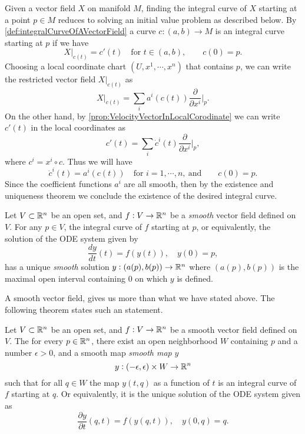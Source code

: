 Given a vector field $ X $ on manifold $ M $, finding the integral curve of $ X $ starting at a point $ p \in M $ reduces to solving an initial value problem as described below. By \autoref{def:integralCurveOfAVectorField} a curve $ c:(a,b) \to M $ is an integral curve starting at $ p $ if we have
\[ X|_{c(t)} = c'(t) \quad \text{for } t\in (a,b),\qquad c(0) = p.   \]
Choosing a local coordinate chart $ (U,x^1,\cdots,x^n) $ that contains $ p $, we can write the restricted vector field $ X|_{c(t)} $ as
\[ X|_{c(t)} = \sum_i a^i(c(t)) \frac{\partial}{\partial x^i}\big|_{p}.  \]
On the other hand, by \autoref{prop:VelocityVectorInLocalCorodinate} we can write $ c'(t) $ in the local coordinates as
\[ c'(t) = \sum_i \dot{c}^i(t) \frac{\partial }{\partial x^i}\big|_{p},    \]
where $ c^i = x^i \circ c $.
Thus we will have
\[ \dot{c}^i(t) = a^i(c(t)) \quad \text{for } i=1,\cdots,n,\ \text{and} \qquad c(0) = p.\]
Since the coefficient functions $ a^i $ are all smooth, then by the existence and uniqueness theorem we conclude the existence of the desired integral curve. 

\begin{theorem}
	Let $ V \subset \mathbb{R}^n $ be an open set, and $ f: V\to \mathbb{R}^n $ be a \emph{smooth} vector field defined on $ V $. For any $ p \in V $,  the integral curve of $ f $ starting at $ p $, or equivalently, the solution of the ODE system given by
	\[ \frac{d y }{dt}(t) = f(y(t)), \quad y(0) = p, \]
	has a unique \emph{smooth} solution $ y:(a(p),b(p)) \to \mathbb{R}^n $ where $ (a(p),b(p)) $ is the maximal open interval containing $ 0 $ on which $ y $ is defined. 
\end{theorem}

A smooth vector field, gives us more than what we have stated above. The following theorem states such an statement.

\begin{theorem}
	Let $ V\subset \mathbb{R}^n $ be an open set, and $ f:V\to \mathbb{R}^n $ be a smooth vector field defined on $ V $. The for every $ p \in \mathbb{R}^n $, there exist an open neighborhood $ W $ containing $ p $ and a number $ \epsilon>0 $, and a smooth map \emph{smooth map} $ y $
	\[ y: (-\epsilon,\epsilon) \times W \to \mathbb{R}^n \]
	such that for all $ q \in W $ the map $ y(t,q) $ as a function of $ t $ is an integral curve of $ f $ starting at $ q $. Or equivalently, it is the unique solution of the ODE system given as
	\[ \frac{\partial y}{\partial t}(q,t) = f(y(q,t)), \quad y(0,q) = q.\]
\end{theorem}

